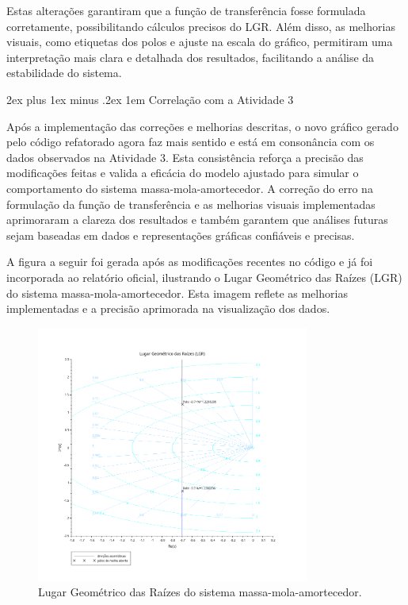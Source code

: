 \documentclass{article}
\makeatletter
\renewcommand\paragraph{\@startsection{paragraph}{4}{\z@}%
    {2ex plus 1ex minus .2ex}%
    {1em}%
    {\normalfont\normalsize\bfseries}}
\makeatother
\begin{document}
Estas alterações garantiram que a função de transferência fosse formulada corretamente, possibilitando cálculos precisos do LGR. Além disso, as melhorias visuais, como etiquetas dos polos e ajuste na escala do gráfico, permitiram uma interpretação mais clara e detalhada dos resultados, facilitando a análise da estabilidade do sistema.

\paragraph{Correlação com a Atividade 3}

Após a implementação das correções e melhorias descritas, o novo gráfico gerado pelo código refatorado agora faz mais sentido e está em consonância com os dados observados na Atividade 3. Esta consistência reforça a precisão das modificações feitas e valida a eficácia do modelo ajustado para simular o comportamento do sistema massa-mola-amortecedor. A correção do erro na formulação da função de transferência e as melhorias visuais implementadas aprimoraram a clareza dos resultados e também garantem que análises futuras sejam baseadas em dados e representações gráficas confiáveis e precisas.

A figura a seguir foi gerada após as modificações recentes no código e já foi incorporada ao relatório oficial, ilustrando o Lugar Geométrico das Raízes (LGR) do sistema massa-mola-amortecedor. Esta imagem reflete as melhorias implementadas e a precisão aprimorada na visualização dos dados.

\begin{figure}[h]
  \centering
  \includegraphics[width=0.8\textwidth]{atividades/7-atividade/assets/lgr.png}
  \caption{Lugar Geométrico das Raízes do sistema massa-mola-amortecedor.}
  \label{fig:LGR}
\end{figure}

\end{document}
